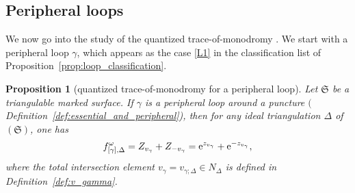 \documentclass[10pt,a4paper]{amsart}
\numberwithin{equation}{section}
\newtheorem{Proposition}[Theorem]{Proposition}
\theoremstyle{definition}
\begin{document}
\subsection{Peripheral loops}
We now go into the study of the quantized trace-of-monodromy . We start with a peripheral loop $\gamma$, which appears as the case \ref{L1} in the classification list of Proposition~\ref{prop:loop_classification}.
\begin{Proposition}[quantized trace-of-monodromy for a peripheral loop]
\label{prop:quantized_trace-of-monodromy_peripheral}
Let $\mathfrak{S}$ be a triangulable marked surface. If $\gamma$ is a peripheral loop around a puncture $($Definition~{\rm \ref{def:essential_and_peripheral})}, then for any ideal triangulation $\Delta$ of $(\mathfrak{S})$, one has
\begin{align*}
f^\omega_{[\gamma],\Delta} = Z_{v_\gamma} + Z_{-v_\gamma} = {\rm e}^{z_{v_\gamma}} + {\rm e}^{-z_{v_\gamma}},
\end{align*}
where the total intersection element $v_\gamma = v_{\gamma;\Delta} \in N_\Delta$ is defined in Definition~{\rm \ref{def:v_gamma}}.
\end{Proposition}
\end{document}
